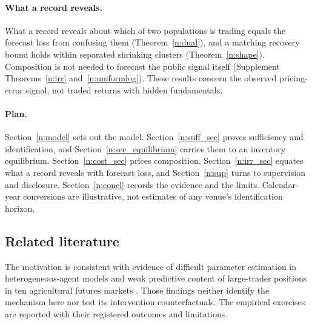 \documentclass[12pt]{article}
\theoremstyle{definition}
\theoremstyle{remark}
\begin{document}
\paragraph{What a record reveals.} What a record reveals about which of two populations is trading equals the forecast loss from confusing them (Theorem~\ref{n:dual}), and a matching recovery bound holds within separated shrinking clusters (Theorem~\ref{n:shape}). Composition is not needed to forecast the public signal itself (Supplement Theorems~\ref{n:irr} and~\ref{n:uniformlog}). These results concern the observed pricing-error signal, not traded returns with hidden fundamentals.

\paragraph{Plan.} Section~\ref{n:model} sets out the model. Section~\ref{n:suff_sec} proves sufficiency and identification, and Section~\ref{n:sec_equilibrium} carries them to an inventory equilibrium. Section~\ref{n:cost_sec} prices composition, Section~\ref{n:irr_sec} equates what a record reveals with forecast loss, and Section~\ref{n:sup} turns to supervision and disclosure. Section~\ref{n:concl} records the evidence and the limits. Calendar-year conversions are illustrative, not estimates of any venue's identification horizon.

\subsection{Related literature}\label{n:lit}

The motivation is consistent with evidence of difficult parameter estimation in heterogeneous-agent models \citep{lux2018} and weak predictive content of large-trader positions in ten agricultural futures markets \citep{sanders2009}. Those findings neither identify the mechanism here nor test its intervention counterfactuals. The empirical exercises are reported with their registered outcomes and limitations.
\end{document}
